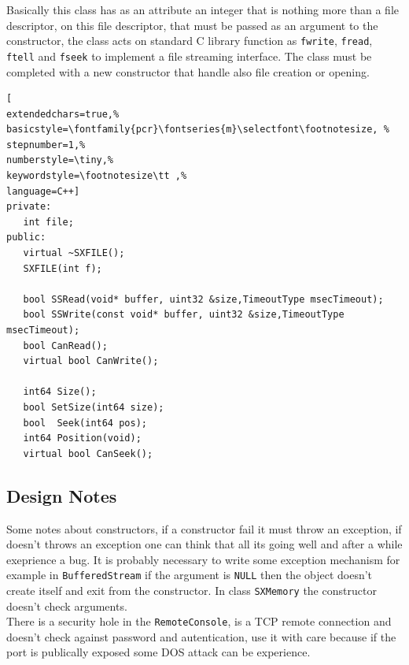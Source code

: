 Basically this class has as an attribute an integer that is nothing more than a file descriptor, on this file descriptor, that must be passed as an argument to the constructor, the class acts on standard C library function as \texttt{fwrite}, \texttt{fread}, \texttt{ftell} and \texttt{fseek} to implement a file streaming interface.
The class must be completed with a new constructor that handle also file creation or opening.
\begin{lstlisting}[
extendedchars=true,%
basicstyle=\fontfamily{pcr}\fontseries{m}\selectfont\footnotesize, %
stepnumber=1,%
numberstyle=\tiny,%
keywordstyle=\footnotesize\tt ,%
language=C++]
private:
   int file;
public:
   virtual ~SXFILE();
   SXFILE(int f);

   bool SSRead(void* buffer, uint32 &size,TimeoutType msecTimeout);
   bool SSWrite(const void* buffer, uint32 &size,TimeoutType msecTimeout);
   bool CanRead();
   virtual bool CanWrite();

   int64 Size();
   bool SetSize(int64 size);
   bool  Seek(int64 pos);
   int64 Position(void);
   virtual bool CanSeek();
\end{lstlisting}



\subsection{Design Notes}
Some notes about constructors, if a constructor fail it must throw an exception, if doesn't throws an exception one can think that all its going well and after a while exeprience a bug. It is probably necessary to write some exception mechanism for example in \texttt{BufferedStream} if the argument is \texttt{NULL} then the object doesn't create itself and exit from the constructor. In class \texttt{SXMemory} the constructor doesn't check arguments.\\


There is a security hole in the \texttt{RemoteConsole}, is a TCP remote connection and doesn't check against password and autentication, use it with care because if the port is publically exposed some DOS attack can be experience.



